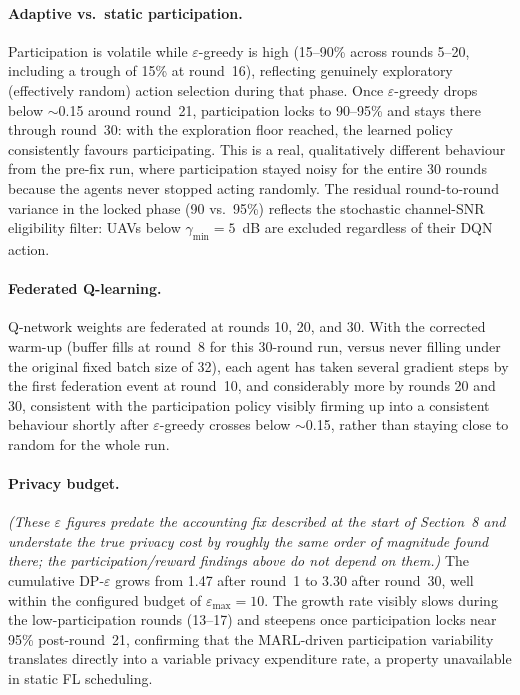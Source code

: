 \documentclass[12pt,a4paper]{article}
\begin{document}
\paragraph{Adaptive vs.\ static participation.}
Participation is volatile while $\varepsilon$-greedy is high (15--90\% across
rounds 5--20, including a trough of 15\% at round~16), reflecting genuinely
exploratory (effectively random) action selection during that phase.
Once $\varepsilon$-greedy drops below $\sim$0.15 around round~21, participation
locks to 90--95\% and stays there through round~30: with the exploration floor
reached, the learned policy consistently favours participating. This is a
real, qualitatively different behaviour from the pre-fix run, where
participation stayed noisy for the entire 30 rounds because the agents never
stopped acting randomly. The residual round-to-round variance in the locked
phase (90 vs.\ 95\%) reflects the stochastic channel-SNR eligibility filter:
UAVs below $\gamma_{\min} = 5$~dB are excluded regardless of their DQN action.

\paragraph{Federated Q-learning.}
Q-network weights are federated at rounds 10, 20, and 30. With the corrected
warm-up (buffer fills at round~8 for this 30-round run, versus never filling
under the original fixed batch size of 32), each agent has taken several
gradient steps by the first federation event at round~10, and considerably
more by rounds 20 and 30, consistent with the participation policy
visibly firming up into a consistent behaviour shortly after $\varepsilon$-greedy
crosses below $\sim$0.15, rather than staying close to random for the whole run.

\paragraph{Privacy budget.}
\emph{(These $\varepsilon$ figures predate the accounting fix described at
the start of Section~8 and understate the true privacy cost by roughly the
same order of magnitude found there; the participation/reward findings
above do not depend on them.)} The cumulative DP-$\varepsilon$ grows from
1.47 after round~1 to 3.30 after round~30, well within the configured budget
of $\varepsilon_{\max} = 10$. The
growth rate visibly slows during the low-participation rounds (13--17) and
steepens once participation locks near 95\% post-round~21, confirming that
the MARL-driven participation variability translates directly into a variable
privacy expenditure rate, a property unavailable in static FL scheduling.
\end{document}
